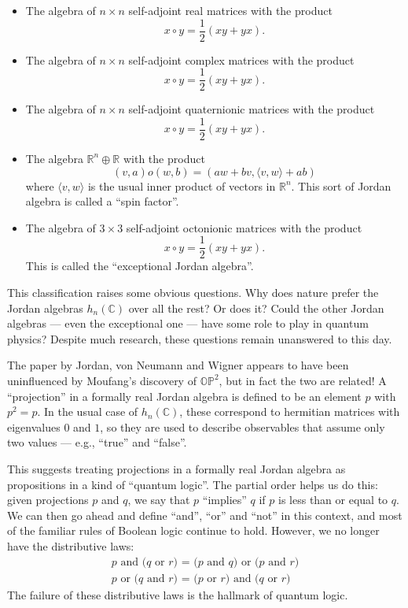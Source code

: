 \documentclass{article}
\def\tightlist{}
\begin{document}
\begin{itemize}
\tightlist
\item
  The algebra of \(n\times n\) self-adjoint real matrices with the
  product \[x\circ y = \frac12(xy + yx).\]
\item
  The algebra of \(n\times n\) self-adjoint complex matrices with the
  product \[x\circ y = \frac12(xy + yx).\]
\item
  The algebra of \(n\times n\) self-adjoint quaternionic matrices with
  the product \[x\circ y = \frac12(xy + yx).\]
\item
  The algebra \(\mathbb{R}^n\oplus\mathbb{R}\) with the product
  \[(v,a) o (w,b) = (aw + bv, \langle v,w\rangle + ab)\] where
  \(\langle v,w\rangle\) is the usual inner product of vectors in
  \(\mathbb{R}^n\). This sort of Jordan algebra is called a ``spin
  factor''.
\item
  The algebra of \(3\times3\) self-adjoint octonionic matrices with the
  product \[x\circ y = \frac12(xy + yx).\] This is called the
  ``exceptional Jordan algebra''.
\end{itemize}

This classification raises some obvious questions. Why does nature
prefer the Jordan algebras \(h_n(\mathbb{C})\) over all the rest? Or
does it? Could the other Jordan algebras --- even the exceptional one
--- have some role to play in quantum physics? Despite much research,
these questions remain unanswered to this day.

The paper by Jordan, von Neumann and Wigner appears to have been
uninfluenced by Moufang's discovery of \(\mathbb{OP}^2\), but in fact
the two are related! A ``projection'' in a formally real Jordan algebra
is defined to be an element \(p\) with \(p^2 = p\). In the usual case of
\(h_n(\mathbb{C})\), these correspond to hermitian matrices with
eigenvalues \(0\) and \(1\), so they are used to describe observables
that assume only two values --- e.g., ``true'' and ``false''.

This suggests treating projections in a formally real Jordan algebra as
propositions in a kind of ``quantum logic''. The partial order helps us
do this: given projections \(p\) and \(q\), we say that \(p\)
``implies'' \(q\) if \(p\) is less than or equal to \(q\). We can then
go ahead and define ``and'', ``or'' and ``not'' in this context, and
most of the familiar rules of Boolean logic continue to hold. However,
we no longer have the distributive laws: \[
  \begin{gathered}
    \mbox{$p$ and ($q$ or $r$) = ($p$ and $q$) or ($p$ and $r$)}
  \\\mbox{$p$ or ($q$ and $r$) = ($p$ or $r$) and ($q$ or $r$)}
  \end{gathered}
\] The failure of these distributive laws is the hallmark of quantum
logic.
\end{document}
